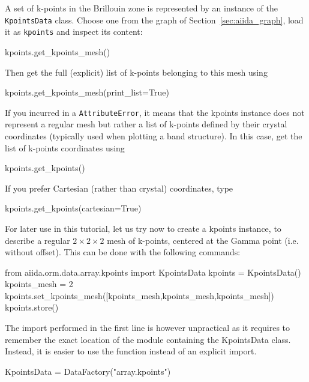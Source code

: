 A set of k-points in the Brillouin zone is represented by an instance of the
\texttt{KpointsData} class. Choose one from the graph of Section~\ref{sec:aiida_graph},
load it as \texttt{kpoints} and inspect its content:
\begin{pythoncommand}
 kpoints.get_kpoints_mesh()
\end{pythoncommand}
Then get the full (explicit) list of k-points belonging to this mesh using
\begin{pythoncommand}
 kpoints.get_kpoints_mesh(print_list=True)
\end{pythoncommand}
If you incurred in a \texttt{AttributeError}, it means that the kpoints instance does not 
represent a regular mesh but rather a list of 
k-points defined by their crystal coordinates (typically used when plotting a band structure).
In this case, get the list of k-points coordinates using
\begin{pythoncommand}
 kpoints.get_kpoints()
\end{pythoncommand}
If you prefer Cartesian (rather than crystal) coordinates, type
\begin{pythoncommand}
 kpoints.get_kpoints(cartesian=True)
\end{pythoncommand}

For later use in this tutorial, let us try now to create a kpoints instance, to 
describe a regular $2\times2\times2$ mesh of k-points, centered at the Gamma point (i.e. without offset).
This can be done with the following commands:
\begin{pythoncommand}
 from aiida.orm.data.array.kpoints import KpointsData
 kpoints = KpointsData()
 kpoints_mesh = 2
 kpoints.set_kpoints_mesh([kpoints_mesh,kpoints_mesh,kpoints_mesh])
 kpoints.store()
\end{pythoncommand}

The import performed in the first line is however unpractical as it requires to remember the exact location of the module containing the KpointsData class. Instead, it is easier to use the  function instead of an explicit import.

\begin{pythoncommand}
 KpointsData = DataFactory("array.kpoints")
\end{pythoncommand}

